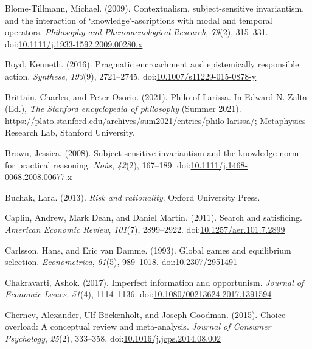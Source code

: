 \documentclass[
  10pt,
  letterpaper,
  twoside]{scrbook}
\newlength{\cslhangindent}
\newenvironment{CSLReferences}[2] %
 {\begin{list}{}{%
  \setlength{\itemindent}{0pt}
  \setlength{\leftmargin}{0pt}
  \setlength{\parsep}{0pt}
  \ifodd #1
   \setlength{\leftmargin}{\cslhangindent}
   \setlength{\itemindent}{-1\cslhangindent}
  \fi
  \setlength{\itemsep}{#2\baselineskip}}}
 {\end{list}}
\begin{document}
\begin{CSLReferences}{1}{0}
Blome-Tillmann, Michael. (2009). Contextualism, subject-sensitive
invariantism, and the interaction of {`knowledge'}-ascriptions with
modal and temporal operators. \emph{Philosophy and Phenomenological
Research}, \emph{79}(2), 315--331.
doi:\href{https://doi.org/10.1111/j.1933-1592.2009.00280.x}{10.1111/j.1933-1592.2009.00280.x}

Boyd, Kenneth. (2016). Pragmatic encroachment and epistemically
responsible action. \emph{Synthese}, \emph{193}(9), 2721--2745.
doi:\href{https://doi.org/10.1007/s11229-015-0878-y}{10.1007/s11229-015-0878-y}

Brittain, Charles, and Peter Osorio. (2021). {Philo of Larissa}. In
Edward N. Zalta (Ed.), \emph{The {Stanford} encyclopedia of philosophy}
({S}ummer 2021).
\url{https://plato.stanford.edu/archives/sum2021/entries/philo-larissa/};
Metaphysics Research Lab, Stanford University.

Brown, Jessica. (2008). Subject-sensitive invariantism and the knowledge
norm for practical reasoning. \emph{No{û}s}, \emph{42}(2), 167--189.
doi:\href{https://doi.org/10.1111/j.1468-0068.2008.00677.x}{10.1111/j.1468-0068.2008.00677.x}

Buchak, Lara. (2013). \emph{Risk and rationality}. Oxford University
Press.

Caplin, Andrew, Mark Dean, and Daniel Martin. (2011). Search and
satisficing. \emph{American Economic Review}, \emph{101}(7), 2899--2922.
doi:\href{https://doi.org/10.1257/aer.101.7.2899}{10.1257/aer.101.7.2899}

Carlsson, Hans, and Eric van Damme. (1993). Global games and equilibrium
selection. \emph{Econometrica}, \emph{61}(5), 989--1018.
doi:\href{https://doi.org/10.2307/2951491}{10.2307/2951491}

Chakravarti, Ashok. (2017). Imperfect information and opportunism.
\emph{Journal of Economic Issues}, \emph{51}(4), 1114--1136.
doi:\href{https://doi.org/10.1080/00213624.2017.1391594}{10.1080/00213624.2017.1391594}

Chernev, Alexander, Ulf Böckenholt, and Joseph Goodman. (2015). Choice
overload: A conceptual review and meta-analysis. \emph{Journal of
Consumer Psychology}, \emph{25}(2), 333--358.
doi:\href{https://doi.org/10.1016/j.jcps.2014.08.002}{10.1016/j.jcps.2014.08.002}


\end{CSLReferences}
\end{document}
